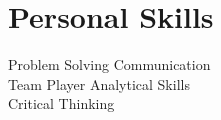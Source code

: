 \documentclass[]{deedy-resume-openfont}
\begin{document}
\begin{minipage}[t]{0.33\textwidth}



\section{Personal Skills}
\textbullet{} Problem Solving \textbullet{} Communication \\ 
\textbullet{} Team Player  \textbullet{} Analytical Skills \\ 
 \textbullet{} Critical Thinking\\
\sectionsep

\sectionsep

%
%

\end{minipage} 
\hfill
\end{document}
